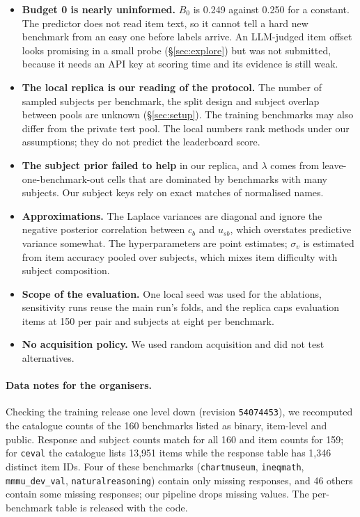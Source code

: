 \documentclass{article}
\begin{document}
\begin{itemize}
  \item \textbf{Budget 0 is nearly uninformed.} $B_0$ is 0.249 against 0.250 for a constant. The predictor does not read item text, so it cannot tell a hard new benchmark from an easy one before labels arrive. An LLM-judged item offset looks promising in a small probe (\S\ref{sec:explore}) but was not submitted, because it needs an API key at scoring time and its evidence is still weak.
  \item \textbf{The local replica is our reading of the protocol.} The number of sampled subjects per benchmark, the split design and subject overlap between pools are unknown (\S\ref{sec:setup}). The training benchmarks may also differ from the private test pool. The local numbers rank methods under our assumptions; they do not predict the leaderboard score.
  \item \textbf{The subject prior failed to help} in our replica, and $\lambda$ comes from leave-one-benchmark-out cells that are dominated by benchmarks with many subjects. Our subject keys rely on exact matches of normalised names.
  \item \textbf{Approximations.} The Laplace variances are diagonal and ignore the negative posterior correlation between $c_b$ and $u_{sb}$, which overstates predictive variance somewhat. The hyperparameters are point estimates; $\sigma_v$ is estimated from item accuracy pooled over subjects, which mixes item difficulty with subject composition.
  \item \textbf{Scope of the evaluation.} One local seed was used for the ablations, sensitivity runs reuse the main run's folds, and the replica caps evaluation items at 150 per pair and subjects at eight per benchmark.
  \item \textbf{No acquisition policy.} We used random acquisition and did not test alternatives.
\end{itemize}

\paragraph{Data notes for the organisers.} Checking the training release one level down (revision \texttt{54074453}), we recomputed the catalogue counts of the 160 benchmarks listed as binary, item-level and public. Response and subject counts match for all 160 and item counts for 159; for \texttt{ceval} the catalogue lists 13{,}951 items while the response table has 1{,}346 distinct item IDs. Four of these benchmarks (\texttt{chartmuseum}, \texttt{ineqmath}, \texttt{mmmu\_dev\_val}, \texttt{naturalreasoning}) contain only missing responses, and 46 others contain some missing responses; our pipeline drops missing values. The per-benchmark table is released with the code.
\end{document}
